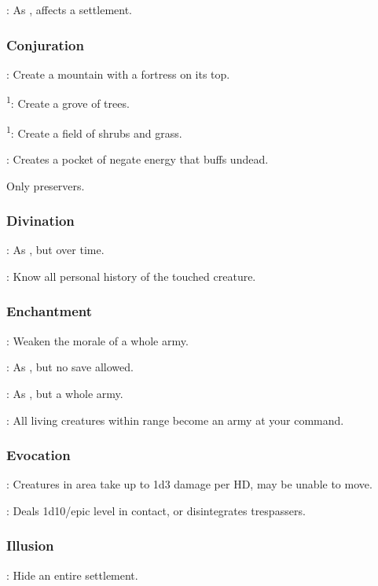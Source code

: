 : As , affects a settlement. %


\subsubsection{Conjuration}
: Create a mountain with a fortress on its top.

\textsuperscript{1}: Create a grove of trees.

\textsuperscript{1}: Create a field of shrubs and grass.

: Creates a pocket of negate energy that buffs undead.

 Only preservers.


\subsubsection{Divination}
: As , but over time. %

: Know all personal history of the touched creature.


\subsubsection{Enchantment}
: Weaken the morale of a whole army.

: As , but no save allowed.

: As , but a whole army.

: All living creatures within range become an army at your command.


\subsubsection{Evocation}
: Creatures in area take up to 1d3 damage per HD, may be unable to move.

: Deals 1d10/epic level in contact, or disintegrates trespassers.


\subsubsection{Illusion}
: Hide an entire settlement. %

